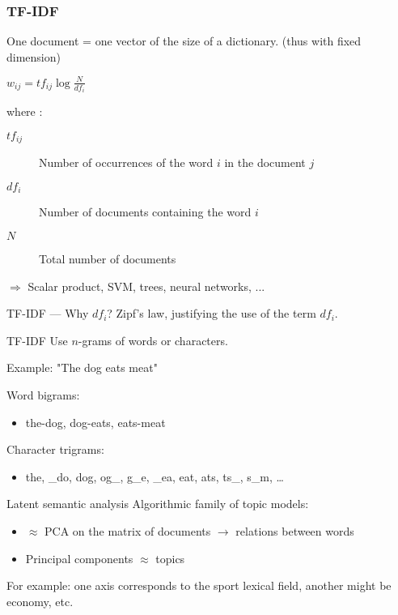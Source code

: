 \begin{frame}
  \frametitle{TF-IDF}
  One document = one vector of the size of a dictionary. (thus with fixed dimension) \\
  \begin{center}
    $\boxed{w_{ij} = tf_{ij}\log{\frac{N}{df_i}}}$
  \end{center}
  where :

  \begin{description}
    \item[$tf_{ij}$] Number of occurrences of the word $i$ in the document $j$
    \item[$df_i$] Number of documents containing the word $i$
    \item[$N$] Total number of documents
  \end{description}
  $\Rightarrow$ Scalar product, SVM, trees, neural networks, ...
\end{frame}

\begin{frame}{TF-IDF --- Why $df_i$?}
  Zipf's law, justifying the use of the term $df_i$.
\end{frame}

\begin{frame}{TF-IDF}
  Use $n$-grams of words or characters.
  \begin{center}
  Example: "The dog eats meat"
  \end{center}

  Word bigrams:

  \begin{itemize}
  \item the-dog, dog-eats, eats-meat
  \end{itemize}

  Character trigrams:

  \begin{itemize}
  \item the, \_do, dog, og\_, g\_e, \_ea, eat, ats, ts\_, s\_m, …
  \end{itemize}
\end{frame}

\begin{frame}{Latent semantic analysis}
  Algorithmic family of topic models:

  \begin{itemize}
    \item $\approx$ PCA on the matrix of documents $\rightarrow$ relations between words
    \item Principal components $\approx$ topics
  \end{itemize}

  For example: one axis corresponds to the sport lexical field, another might be economy, etc.
\end{frame}
